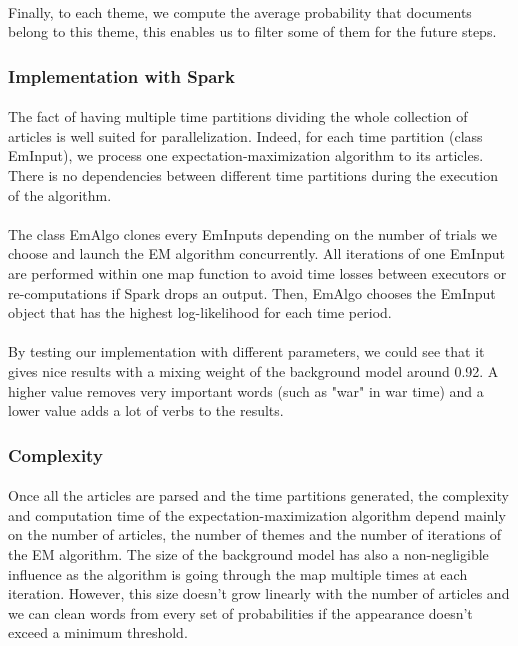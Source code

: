 \paragraph{}
Finally, to each theme, we compute the average probability that documents belong to this theme, this enables us to filter some of them for the future steps.

\subsubsection{Implementation with Spark}

\paragraph{}
The fact of having multiple time partitions dividing the whole collection of articles is well suited for parallelization. Indeed, for each time partition (class EmInput), we process one expectation-maximization algorithm to its articles. There is no dependencies between different time partitions during the execution of the algorithm.

\paragraph{}
The class EmAlgo clones every EmInputs depending on the number of trials we choose and launch the EM algorithm concurrently. All iterations of one EmInput are performed within one map function to avoid time losses between executors or re-computations if Spark drops an output. Then, EmAlgo chooses the EmInput object that has the highest log-likelihood for each time period.

\paragraph{}
By testing our implementation with different parameters, we could see that it gives nice results with a mixing weight of the background model around 0.92. A higher value removes very important words (such as "war" in war time) and a lower value adds a lot of verbs to the results.

\subsubsection{Complexity}

\paragraph{}
Once all the articles are parsed and the time partitions generated, the complexity and computation time of the expectation-maximization algorithm depend mainly on the number of articles, the number of themes and the number of iterations of the EM algorithm.
The size of the background model has also a non-negligible influence as the algorithm is going through the map multiple times at each iteration. However, this size doesn't grow linearly with the number of articles and we can clean words from every set of probabilities if the appearance doesn't exceed a minimum threshold.

